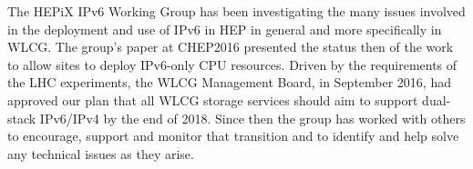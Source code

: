 
The HEPiX IPv6 Working Group \cite{ipv6wg} has been investigating the many issues involved in the deployment and use of
IPv6 in HEP in general and more specifically in WLCG. The group's paper at CHEP2016 \cite{ipv6chep2016}
presented the status then of the work to allow sites to deploy IPv6-only CPU resources. Driven by the
requirements of the LHC experiments, the WLCG Management Board, in September 2016, had approved our plan
that all WLCG storage services should aim to support dual-stack IPv6/IPv4 by the end of 2018. Since then the
group has worked with others to encourage, support and monitor that transition and to identify and help
solve any technical issues as they arise.


 
